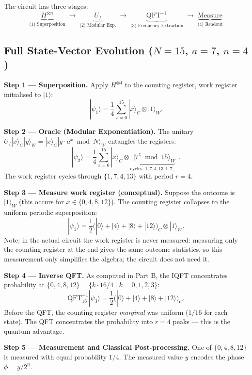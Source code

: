 \documentclass[a4paper,11pt]{article}
\providecommand{\ket}[1]{|#1\rangle}
\begin{document}
The circuit has three stages:
\[
    \underbrace{H^{\otimes n}}_{\text{(1) Superposition}}
    \;\longrightarrow\;
    \underbrace{U_f}_{\text{(2) Modular Exp.}}
    \;\longrightarrow\;
    \underbrace{\text{QFT}^{-1}}_{\text{(3) Frequency Extraction}}
    \;\longrightarrow\;
    \underbrace{\text{Measure}}_{\text{(4) Readout}}
\]

\subsection{Full State-Vector Evolution ($N=15$, $a=7$, $n=4$)}

\begin{mathbox}

\textbf{Step 1 — Superposition.} Apply $H^{\otimes 4}$ to the counting register,
work register initialised to $\ket{1}$:
\[
    \ket{\psi_1} = \frac{1}{4}\sum_{x=0}^{15} \ket{x}_C \otimes \ket{1}_W.
\]

\textbf{Step 2 — Oracle (Modular Exponentiation).}
The unitary $U_f\ket{x}_C\ket{y}_W = \ket{x}_C\ket{y \cdot a^x \bmod N}_W$
entangles the registers:
\[
    \ket{\psi_2} = \frac{1}{4}\sum_{x=0}^{15} \ket{x}_C \otimes
    \underbrace{\ket{7^x \bmod 15}_W}_{\text{cycles: }1,7,4,13,1,7,\ldots}.
\]
The work register cycles through $\{1, 7, 4, 13\}$ with period $r=4$.

\textbf{Step 3 — Measure work register (conceptual).}
Suppose the outcome is $\ket{1}_W$ (this occurs for $x \in \{0, 4, 8, 12\}$).
The counting register collapses to the uniform periodic superposition:
\[
    \ket{\psi_3} = \frac{1}{2}\bigl(\ket{0}+\ket{4}+\ket{8}+\ket{12}\bigr)_C
    \otimes \ket{1}_W.
\]
Note: in the actual circuit the work register is never measured: measuring only the
counting register at the end gives the same outcome statistics, so this measurement only
simplifies the algebra; the circuit does not need it.

\textbf{Step 4 — Inverse QFT.}
As computed in Part B, the IQFT concentrates probability at
$\{0, 4, 8, 12\} = \{k \cdot 16/4 \mid k = 0,1,2,3\}$:
\[
    \text{QFT}^{-1}_{16}\ket{\psi_3} =
    \frac{1}{2}\bigl(\ket{0}+\ket{4}+\ket{8}+\ket{12}\bigr)_C.
\]
Before the QFT, the counting register \emph{marginal} was uniform
($1/16$ for each state). The QFT concentrates the probability into $r=4$ peaks
— this is the quantum advantage.

\textbf{Step 5 — Measurement and Classical Post-processing.}
One of $\{0, 4, 8, 12\}$ is measured with equal probability $1/4$.
The measured value $y$ encodes the phase $\phi = y/2^n$.

\end{mathbox}
\end{document}
